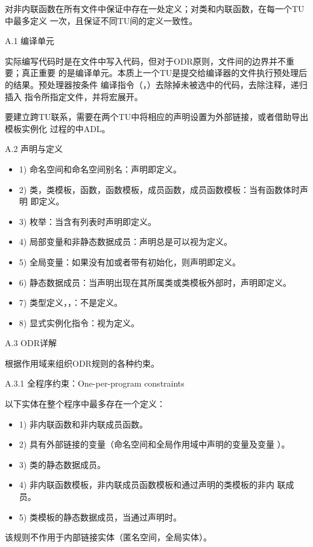 \begin{transnote}

对非内联函数在所有文件中保证中存在一处定义；对类和内联函数，在每一个TU中最多定义
一次，且保证不同TU间的定义一致性。

A.1 编译单元

实际编写代码时是在文件中写入代码，但对于ODR原则，文件间的边界并不重要；真正重要
的是编译单元。本质上一个TU是提交给编译器的文件执行预处理后的结果。预处理器按条件
编译指令（，）去除掉未被选中的代码，去除注释，递归插入
指令所指定文件，并将宏展开。

要建立跨TU联系，需要在两个TU中将相应的声明设置为外部链接，或者借助导出模板实例化
过程的中ADL。

A.2 声明与定义

\begin{itemize}
  \item 1) 命名空间和命名空间别名：声明即定义。
  \item 2) 类，类模板，函数，函数模板，成员函数，成员函数模板：当有函数体时声明
        即定义。
  \item 3) 枚举：当含有\enumr{}列表时声明即定义。
  \item 4) 局部变量和非静态数据成员：声明总是可以视为定义。
  \item 5) 全局变量：如果没有加或者带有初始化，则声明即定义。
  \item 6) 静态数据成员：当声明出现在其所属类或类模板外部时，声明即定义。
  \item 7) 类型定义，，：不是定义。
  \item 8) 显式实例化指令：视为定义。
\end{itemize}

A.3 ODR详解

根据作用域来组织ODR规则的各种约束。

A.3.1 全程序约束：One-per-program constraints

以下实体在整个程序中最多存在一个定义：
\begin{itemize}
  \item 1) 非内联函数和非内联成员函数。
  \item 2) 具有外部链接的变量（命名空间和全局作用域中声明的变量及变量
        ）。
  \item 3) 类的静态数据成员。
  \item 4) 非内联函数模板，非内联成员函数模板和通过声明的类模板的非内
        联成员。
  \item 5) 类模板的静态数据成员，当通过声明时。
\end{itemize}
该规则不作用于内部链接实体（匿名空间，全局实体）。


\end{transnote}
